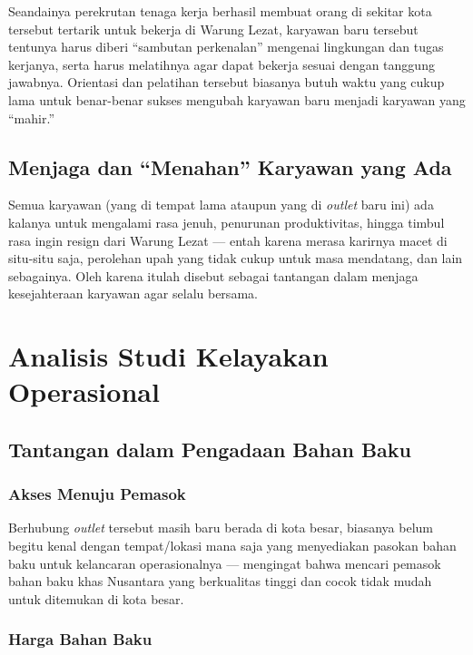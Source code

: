 Seandainya perekrutan tenaga kerja berhasil membuat orang di sekitar kota tersebut tertarik untuk bekerja di Warung Lezat, karyawan baru tersebut tentunya harus diberi “sambutan perkenalan” mengenai lingkungan dan tugas kerjanya, serta harus melatihnya agar dapat bekerja sesuai dengan tanggung jawabnya. Orientasi dan pelatihan tersebut biasanya butuh waktu yang cukup lama untuk benar-benar sukses mengubah karyawan baru menjadi karyawan yang “mahir.”

\subsection{Menjaga dan “Menahan” Karyawan yang Ada}

Semua karyawan (yang di tempat lama ataupun yang di \textit{outlet} baru ini) ada kalanya untuk mengalami rasa jenuh, penurunan produktivitas, hingga timbul rasa ingin resign dari Warung Lezat — entah karena merasa karirnya macet di situ-situ saja, perolehan upah yang tidak cukup untuk masa mendatang, dan lain sebagainya. Oleh karena itulah disebut sebagai tantangan dalam menjaga kesejahteraan karyawan agar selalu bersama.



\section{Analisis Studi Kelayakan Operasional}

\subsection{Tantangan dalam Pengadaan Bahan Baku}

\subsubsection{Akses Menuju Pemasok}

Berhubung \textit{outlet} tersebut masih baru berada di kota besar, biasanya belum begitu kenal dengan tempat/lokasi mana saja yang menyediakan pasokan bahan baku untuk kelancaran operasionalnya — mengingat bahwa mencari pemasok bahan baku khas Nusantara yang berkualitas tinggi dan cocok tidak mudah untuk ditemukan di kota besar.

\subsubsection{Harga Bahan Baku}

